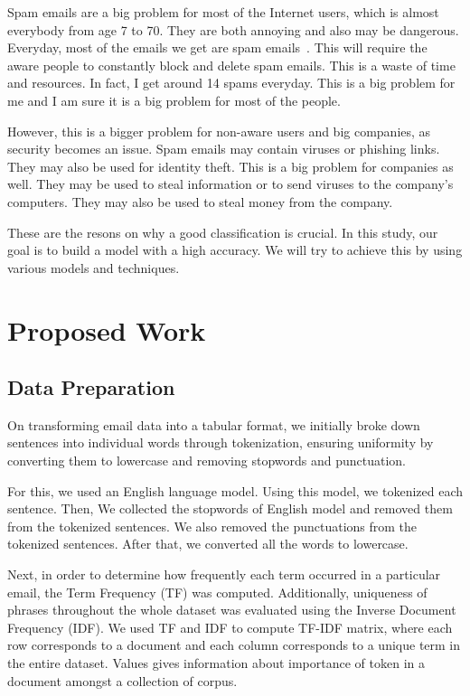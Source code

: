 \documentclass[conference]{IEEEtran}
\begin{document}
Spam emails are a big problem for most of the Internet users, which is almost everybody from age 7 to 70. They are both annoying and also may be dangerous. Everyday, most of the emails we get are spam emails \cite{dataprot_spam}. This will require the aware people to constantly block and delete spam emails. This is a waste of time and resources. In fact, I get around 14 spams everyday. This is a big problem for me and I am sure it is a big problem for most of the people.

However, this is a bigger problem for non-aware users and big companies, as security becomes an issue. Spam emails may contain viruses or phishing links. They may also be used for identity theft. This is a big problem for companies as well. They may be used to steal information or to send viruses to the company's computers. They may also be used to steal money from the company.

These are the resons on why a good classification is crucial. In this study, our goal is to build a model with a high accuracy. We will try to achieve this by using various models and techniques.

\section{Proposed Work}

\subsection{Data Preparation}
On transforming email data into a tabular format, we initially broke down sentences into individual words through tokenization, ensuring uniformity by converting them to lowercase and removing stopwords and punctuation.

For this, we used an English language model. Using this model, we tokenized each sentence. Then, We collected the stopwords of English model and removed them from the tokenized sentences. We also removed the punctuations from the tokenized sentences. After that, we converted all the words to lowercase.

Next, in order to determine how frequently each term occurred in a particular email, the Term Frequency (TF) was computed. Additionally, uniqueness of phrases throughout the whole dataset was evaluated using the Inverse Document Frequency (IDF). We used TF and IDF to compute TF-IDF matrix, where each row corresponds to a document and each column corresponds to a unique term in the entire dataset. Values gives information about importance of token in a document amongst a collection of corpus.
\end{document}
